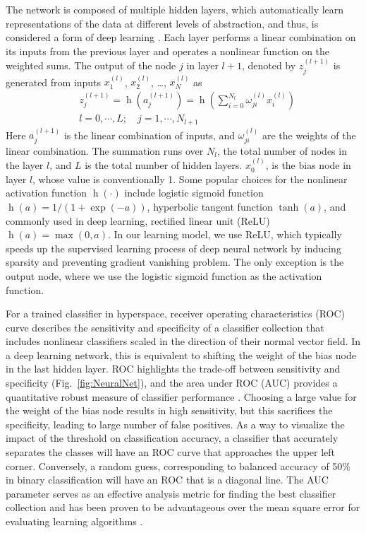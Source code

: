 \documentclass[aps,pra,reprint,superscriptaddress]{revtex4-1}
\DeclareMathOperator{\h}{h} %
\begin{document}
The network is composed of multiple hidden layers, which automatically learn representations of the data at different levels of abstraction, and thus, is considered a form of deep learning \cite{lecun2015deep, schmidhuber2015deep}. Each layer performs a linear combination on its inputs from the previous layer and operates a nonlinear function on the weighted sums. The output of the node $j$ in layer $l+1$, denoted by $z_j^{(l+1)}$ is generated from inputs $x_1^{(l)}$, $x_2^{(l)}$, \ldots, $x_N^{(l)}$ as
\begin{equation}
\begin{split}
& z_j^{(l+1)} = \h(a_j^{(l+1)}) = \h(\sum_{i=0}^{N_l} \omega_{ji}^{(l)} x_i^{(l)})\\
& l=0,\cdots,L;\quad j=1,\cdots,N_{l+1}
\end{split}
\end{equation}
Here $a_j^{(l+1)}$ is the linear combination of inputs, and $\omega_{ji}^{(l)}$ are the weights of the linear combination. The summation runs over $N_l$, the total number of nodes in the layer $l$, and $L$ is the total number of hidden layers. $x_0^{(l)}$, is the bias node in layer $l$, whose value is conventionally 1. Some popular choices for the nonlinear activation function $\h(\cdot)$ include logistic sigmoid function $\h(a)=1/(1+\exp(-a))$, hyperbolic tangent function $\tanh(a)$, and commonly used in deep learning, rectified linear unit (ReLU) $\h(a) = \max(0,a)$. In our learning model, we use ReLU, which typically speeds up the supervised learning process of deep neural network by inducing sparsity and preventing gradient vanishing problem. The only exception is the output node, where we use the logistic sigmoid function as the activation function.

For a trained classifier in hyperspace, receiver operating characteristics (ROC) curve describes the sensitivity and specificity of a classifier collection that includes nonlinear classifiers scaled in the direction of their normal vector field. In a deep learning network, this is equivalent to shifting the weight of the bias node in the last hidden layer. ROC highlights the trade-off between sensitivity and specificity (Fig.~\ref{fig:NeuralNet}), and the area under ROC (AUC) provides a quantitative robust measure of classifier performance \cite{hanley1982meaning, ling2003auc, cortes2004auc, liu2008roc}. Choosing a large value for the weight of the bias node results in high sensitivity, but this sacrifices the specificity, leading to large number of false positives. As a way to visualize the impact of the threshold on classification accuracy, a classifier that accurately separates the classes will have an ROC curve that approaches the upper left corner. Conversely, a random guess, corresponding to balanced accuracy of 50\% in binary classification will have an ROC that is a diagonal line. The AUC parameter serves as an effective analysis metric for finding the best classifier collection and has been proven to be advantageous over the mean square error for evaluating learning algorithms \cite{verrelst1998use}. 
\end{document}

